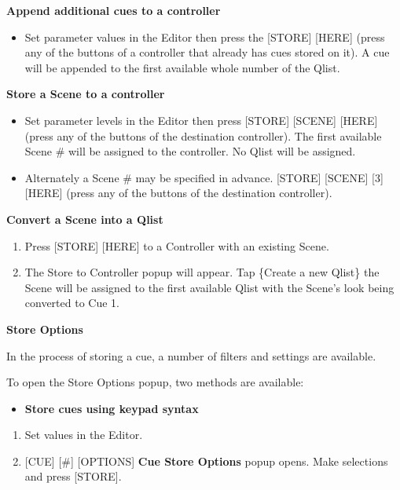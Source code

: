 \documentclass[
]{article}
\providecommand{\tightlist}{%
  \setlength{\itemsep}{0pt}\setlength{\parskip}{0pt}}
\begin{document}
\textbf{Append additional cues to a controller}

\begin{itemize}
\tightlist
\item
  Set parameter values in the Editor then press the {[}STORE{]} {[}HERE{]} (press any of the buttons of a controller that already has cues stored on it). A cue will be appended to the first available whole number of the Qlist.
\end{itemize}

\textbf{Store a Scene to a controller}

\begin{itemize}
\item
  Set parameter levels in the Editor then press {[}STORE{]} {[}SCENE{]} {[}HERE{]} (press any of the buttons of the destination controller). The first available Scene \# will be assigned to the controller. No Qlist will be assigned.
\item
  Alternately a Scene \# may be specified in advance. {[}STORE{]} {[}SCENE{]} {[}3{]} {[}HERE{]} (press any of the buttons of the destination controller).
\end{itemize}

\textbf{Convert a Scene into a Qlist}

\begin{enumerate}
\def\labelenumi{\arabic{enumi}.}
\item
  Press {[}STORE{]} {[}HERE{]} to a Controller with an existing Scene.
\item
  The Store to Controller popup will appear. Tap \{Create a new Qlist\} the Scene will be assigned to the first available Qlist with the Scene's look being converted to Cue 1.
\end{enumerate}

\textbf{Store Options}

In the process of storing a cue, a number of filters and settings are available.

To open the Store Options popup, two methods are available:

\begin{itemize}
\tightlist
\item
  \textbf{Store cues using keypad syntax}
\end{itemize}

\begin{enumerate}
\def\labelenumi{\arabic{enumi}.}
\item
  Set values in the Editor.
\item
  {[}CUE{]} {[}\#{]} {[}OPTIONS{]} \textbf{Cue Store Options} popup opens. Make selections and press {[}STORE{]}.
\end{enumerate}
\end{document}
